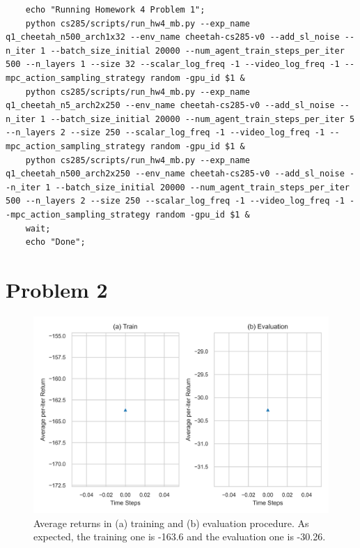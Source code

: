 \documentclass[10pt, letterpaper]{article}
\begin{document}
\begin{lstlisting}
    echo "Running Homework 4 Problem 1";
    python cs285/scripts/run_hw4_mb.py --exp_name q1_cheetah_n500_arch1x32 --env_name cheetah-cs285-v0 --add_sl_noise --n_iter 1 --batch_size_initial 20000 --num_agent_train_steps_per_iter 500 --n_layers 1 --size 32 --scalar_log_freq -1 --video_log_freq -1 --mpc_action_sampling_strategy random -gpu_id $1 &
    python cs285/scripts/run_hw4_mb.py --exp_name q1_cheetah_n5_arch2x250 --env_name cheetah-cs285-v0 --add_sl_noise --n_iter 1 --batch_size_initial 20000 --num_agent_train_steps_per_iter 5 --n_layers 2 --size 250 --scalar_log_freq -1 --video_log_freq -1 --mpc_action_sampling_strategy random -gpu_id $1 &
    python cs285/scripts/run_hw4_mb.py --exp_name q1_cheetah_n500_arch2x250 --env_name cheetah-cs285-v0 --add_sl_noise --n_iter 1 --batch_size_initial 20000 --num_agent_train_steps_per_iter 500 --n_layers 2 --size 250 --scalar_log_freq -1 --video_log_freq -1 --mpc_action_sampling_strategy random -gpu_id $1 &
    wait;
    echo "Done";
\end{lstlisting}

\pagebreak
\section*{Problem 2}

\begin{figure}[thbp]
    \centering
    \includegraphics[width=\textwidth]{q2.png}
    \caption{Average returns in (a) training and (b) evaluation procedure. As expected, the training one is -163.6 and the evaluation one is -30.26.}
    \label{fig:2}
\end{figure}
\end{document}
